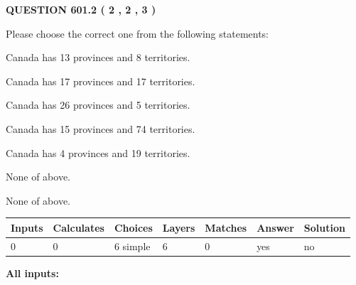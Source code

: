 \documentclass[12pt]{article}
\begin{document}
   
  
\vspace{0.2in}
  
{\textbf{\Large{QUESTION
601.2 
 ( 2 , 2 , 3 )
}}}
  
  
Please choose the correct one from the following statements:
 
 
Canada has  13 provinces and  8 territories.
 
 
Canada has  17 provinces and  17 territories.
 
 
Canada has  26 provinces and  5 territories.
 
 
Canada has  15 provinces and  74 territories.
 
 
Canada has   4 provinces and  19 territories.
 
 
 None of above.
 
 
\noindent{}
 
 
 None of above.
 
 
\noindent{}
 
 
   
   
   
   
\noindent\begin{tabular}{|l|l|l|l|l|l|l|}
 \hline
Inputs & Calculates & Choices & Layers & Matches & Answer & Solution \\ \hline
 0  & 
 0  & 
 6
  simple  
  & 
 6  & 
 0  & 
  yes & 
  no 
  \\ \hline
 \end{tabular}
   
   
   
   
\noindent{}
   
   
   
   
\noindent\vspace{0.1in}\hspace{-0.08in} {\textbf{\Large{All inputs: }}}
   
   
   
   
   
   
 \vspace{0.2in}
 
\end{document}

